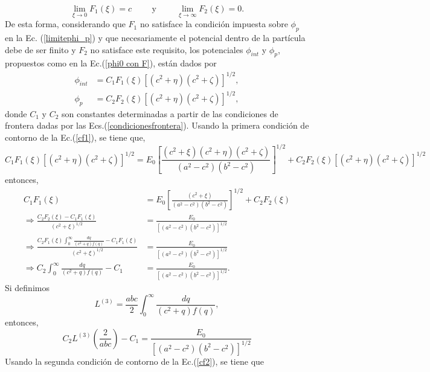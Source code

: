 \begin{equation}
    \lim_{\xi \to 0}F_1(\xi)=c\hspace{1cm}\mbox{y}\hspace{1cm} \lim_{\xi \to \infty}F_2(\xi)=0.
\end{equation}
De esta forma, considerando que $F_1$ no satisface la condición impuesta sobre $\phi_p$ en la Ec. (\ref{limitephi_p}) y que necesariamente el potencial dentro de la partícula debe de ser finito y $F_2$ no satisface este requisito, los potenciales $\phi_{int}$ y $\phi_p$, propuestos como en la Ec.(\ref{phi0 con F}), están dados por
\begin{align}
    \phi_{int}&=C_1F_1(\xi)[(c^2+\eta)(c^2+\zeta)]^{1/2}\label{phi_int},\\
    \phi_p&=C_2F_2(\xi)[(c^2+\eta)(c^2+\zeta)]^{1/2}\label{phi_p},
\end{align}
donde $C_1$ y $C_2$ son constantes determinadas a partir de las condiciones de frontera dadas por las Ecs.(\ref{condicionesfrontera}). Usando la primera condición de contorno de la Ec.(\ref{cf1}), se tiene que,
\begin{equation}
    C_1F_1(\xi)[(c^2+\eta)(c^2+\zeta)]^{1/2}=E_0\left[\frac{(c^2+\xi)(c^2+\eta)(c^2+\zeta)}{(a^2-c^2)(b^2-c^2)}\right]^{1/2}+C_2F_2(\xi)[(c^2+\eta)(c^2+\zeta)]^{1/2}
\end{equation}
entonces, 
\begin{align}
    C_1F_1(\xi)&=E_0\left[\frac{(c^2+\xi)}{(a^2-c^2)(b^2-c^2)}\right]^{1/2}+C_2F_2(\xi)\nonumber\\
    \Rightarrow \frac{C_2F_2(\xi)-C_1F_1(\xi)}{(c^2+\xi)^{1/2}}&=\frac{E_0}{[(a^2-c^2)(b^2-c^2)]^{1/2}}\nonumber\\
    \Rightarrow \frac{C_2 F_1(\xi)\int_{0}^{\infty}\frac{dq}{(c^2+q)f(q)}-C_1F_1(\xi)}{(c^2+\xi)^{1/2}}&=\frac{E_0}{[(a^2-c^2)(b^2-c^2)]^{1/2}}\nonumber\\
    \Rightarrow C_2 \int_{0}^{\infty}\frac{dq}{(c^2+q)f(q)}-C_1&=\frac{E_0}{[(a^2-c^2)(b^2-c^2)]^{1/2}}.
\end{align}
Si definimos
\begin{equation}
    L^{(3)}=\frac{abc}{2}\int_{0}^{\infty}\frac{dq}{(c^2+q)f(q)},
\end{equation}
entonces,
\begin{equation}
    C_2L^{(3)}\left(\frac{2}{abc}\right)-C_1=\frac{E_0}{[(a^2-c^2)(b^2-c^2)]^{1/2}}
    \label{ec1 de cf}
\end{equation}
Usando la segunda condición de contorno de la Ec.(\ref{cf2}), se tiene que
